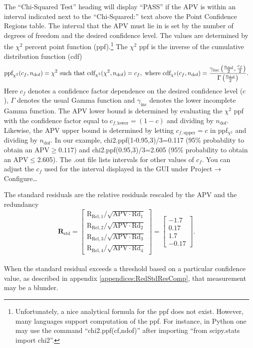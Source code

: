 The ``Chi-Squared Test'' heading will display ``PASS'' if the APV is within an interval indicated next to the ``Chi-Squared:'' text above the Point Confidence Regions table.  The interval that the APV must lie in is set by the number of degrees of freedom and the desired confidence level.  The values are determined by the $\chi^2$ percent point function (ppf).\footnote{Unfortunately, a nice analytical formula for the ppf does not exist.  However, many languages support computation of the ppf.  For instance, in Python one may use the command ``chi2.ppf(cf,ndof)'' after importing ``from scipy.stats import chi2''.}  The $\chi^2$ ppf is the inverse of the cumulative distribution function (cdf)
\begin{equation}
\text{ppf}_{\chi^2}(c_f,n_{\text{dof}})=\chi^2\text{ such that }\text{cdf}_{\chi^2}(\chi^2,n_{\text{dof}})=c_f,\text{ where }\text{cdf}_{\chi^2}(c_f,n_{\text{dof}})=\frac{\gamma_{\text{inc}}\left(\frac{n_{\text{dof}}}{2},\frac{c_f}{2}\right)}{\Gamma\left(\frac{n_{\text{dof}}}{2}\right)}.
\end{equation}
Here $c_f$ denotes a confidence factor dependence on the desired confidence level ($c$), $\Gamma$ denotes the usual Gamma function and $\gamma_{\text{inc}}$ denotes the lower incomplete Gamma function.  The APV lower bound is determined by evaluating the $\chi^2$ ppf with the confidence factor equal to $c_{f,\text{lower}}=(1-c)$ and dividing by $n_{\text{dof}}$.  Likewise, the APV upper bound is determined by letting $c_{f,\text{upper}}=c$ in ppf$_{\chi^2}$ and dividing by $n_{\text{dof}}$.  In our example, chi2.ppf(1-0.95,3)/3=0.117 (95\% probability to obtain an APV$\geq0.117$) and chi2.ppf(0.95,3)/3=2.605 (95\% probability to obtain an APV$\leq$2.605).  The .out file lists intervals for other values of $c_f$.  You can adjust the $c_f$ used for the interval displayed in the GUI under Project $\rightarrow$ Configure\ldots

The standard residuals are the relative residuals rescaled by the APV and the redundancy
\begin{equation}
\mathbf{R}_{\text{std}}=\left[\begin{array}{c}\text{R}_{\text{Rel},1}/\sqrt{\text{APV}\cdot\text{Rd}_1}\\\text{R}_{\text{Rel},2}/\sqrt{\text{APV}\cdot\text{Rd}_2}\\\text{R}_{\text{Rel},3}/\sqrt{\text{APV}\cdot\text{Rd}_3}\\\text{R}_{\text{Rel},4}/\sqrt{\text{APV}\cdot\text{Rd}_4}\end{array}\right]=\left[\begin{array}{c}-1.7\\0.17\\1.7\\-0.17\end{array}\right].
\end{equation}
{}\\
When the standard residual exceeds a threshold based on a particular confidence value, as described in appendix \ref{appendices:RedStdResComp}, that measurement may be a blunder.

